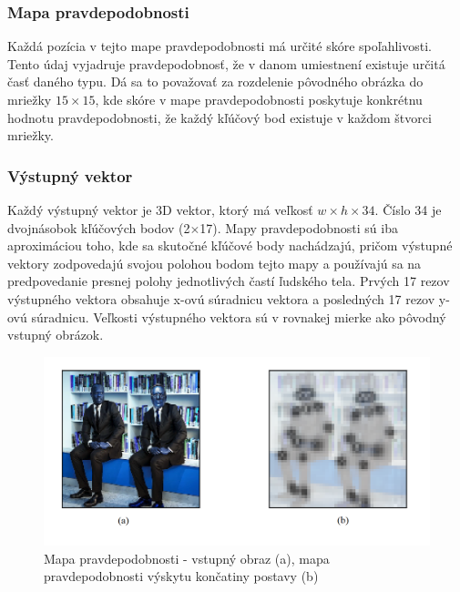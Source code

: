 \documentclass[slovak,master,dept460,male,cpp,cpdeclaration]{diploma}
\begin{document}
\subsubsection*{Mapa pravdepodobnosti}
Každá pozícia v tejto mape pravdepodobnosti má určité skóre spoľahlivosti. Tento údaj vyjadruje pravdepodobnosť, že v danom umiestnení existuje určitá časť daného typu. Dá sa to považovať za rozdelenie pôvodného obrázka do mriežky \textit{$15\times 15$}, kde skóre v mape pravdepodobnosti poskytuje konkrétnu hodnotu pravdepodobnosti, že každý kľúčový bod existuje v každom štvorci mriežky.

\subsubsection*{Výstupný vektor}
Každý výstupný vektor je 3D vektor, ktorý má veľkosť \textit{$w \times h\times 34$}. Číslo 34 je dvojnásobok kľúčových bodov (2$\times$17). Mapy pravdepodobnosti sú iba aproximáciou toho, kde sa skutočné kľúčové body nachádzajú, pričom výstupné vektory zodpovedajú svojou polohou bodom tejto mapy a používajú sa na predpovedanie presnej polohy jednotlivých častí ľudského tela. Prvých 17 rezov výstupného vektora obsahuje x-ovú súradnicu vektora a posledných 17 rezov y-ovú súradnicu. Veľkosti výstupného vektora sú v rovnakej mierke ako pôvodný vstupný obrázok.

\begin{figure}[H]
	\centering
	\includegraphics[width=1\textwidth]{Figures/tfPose1.png}
	\caption{Mapa pravdepodobnosti  - vstupný obraz (a), mapa pravdepodobnosti výskytu končatiny postavy (b)\cite{githubTF}}
	\label{fig:tfPoseHeatmap}
\end{figure}
\end{document}
